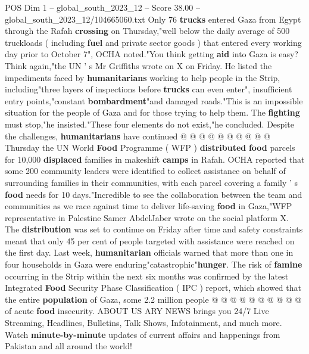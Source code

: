 \begin{textsample}{POS Dim 1 – global\_south\_2023\_12 – Score 38.00 – global\_south\_2023\_12/104665060.txt}
Only 76 \textbf{trucks} entered Gaza from Egypt through the Rafah \textbf{crossing} on Thursday,"well below the daily average of 500 truckloads ( including \textbf{fuel} and private sector goods ) that entered every working day prior to October 7", OCHA noted."You think getting \textbf{aid} into Gaza is easy?
Think again,"the UN ' s Mr Griffiths wrote on X on Friday.
He listed the impediments faced by \textbf{humanitarians} working to help people in the Strip, including"three layers of inspections before \textbf{trucks} can even enter", insufficient entry points,"constant \textbf{bombardment}"and damaged roads."This is an impossible situation for the people of Gaza and for those trying to help them.
The \textbf{fighting} must stop,"he insisted."These four elements do not exist,"he concluded.
Despite the challenges, \textbf{humanitarians} have continued @ @ @ @ @ @ @ @ @ @ Thursday the UN World \textbf{Food} Programme ( WFP ) \textbf{distributed} \textbf{food} parcels for 10,000 \textbf{displaced} families in makeshift \textbf{camps} in Rafah.
OCHA reported that some 200 community leaders were identified to collect assistance on behalf of surrounding families in their communities, with each parcel covering a family ' s \textbf{food} needs for 10 days."Incredible to see the collaboration between the team and communities as we race against time to deliver life-saving \textbf{food} in Gaza,"WFP representative in Palestine Samer AbdelJaber wrote on the social platform X.
The \textbf{distribution} was set to continue on Friday after time and safety constraints meant that only 45 per cent of people targeted with assistance were reached on the first day.
Last week, \textbf{humanitarian} officials warned that more than one in four households in Gaza were enduring"catastrophic"\textbf{hunger}.
The risk of \textbf{famine} occurring in the Strip within the next six months was confirmed by the latest Integrated \textbf{Food} Security Phase Classification ( IPC ) report, which showed that the entire \textbf{population} of Gaza, some 2.2 million people @ @ @ @ @ @ @ @ @ @ of acute \textbf{food} insecurity.
ABOUT US ARY NEWS brings you 24/7 Live Streaming, Headlines, Bulletins, Talk Shows, Infotainment, and much more.
Watch \textbf{minute-by-minute} updates of current affairs and happenings from Pakistan and all around the world!

\end{textsample}
